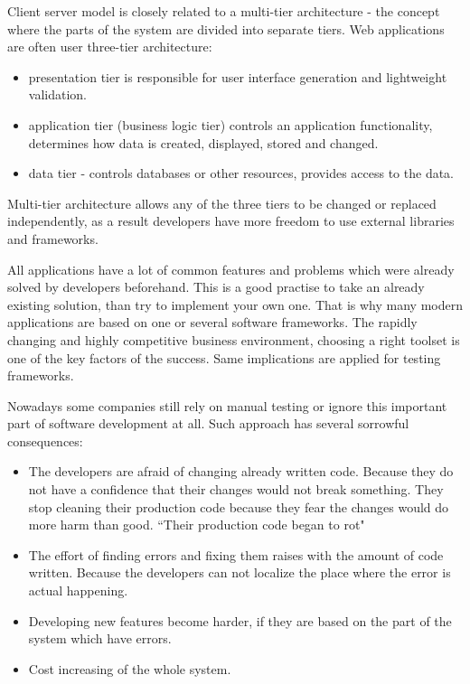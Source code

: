     	Client server model is closely related to a multi-tier architecture - the
    	concept where the parts of the system are divided into separate tiers. Web applications
    	 are often user three-tier architecture:
    	 \begin{itemize}
    	   \item presentation tier is responsible for user interface generation and
    	   lightweight validation.
    	   \item application tier (business logic tier) controls an application
    	   functionality, determines how data is created, displayed, stored and
    	   changed.
    	   \item data tier - controls databases or other resources, provides access
    	   to the data.
    	 \end{itemize}
    	Multi-tier architecture allows any of the three tiers to be changed or
    	replaced independently, as a result developers have more freedom to use
    	external libraries and frameworks.
		
		All	applications have a lot of common features and problems which were already
		solved by developers beforehand. This is a good practise to take an already
		existing solution, than try to implement your own one. That is why many modern applications 
		are based on one or several software frameworks. The rapidly changing and
		highly competitive business environment, choosing a right toolset is one of
		the key factors of the success.
		Same implications are applied for testing frameworks. 	
		
		Nowadays some companies still rely on manual testing or ignore this
		important part of software development at all. Such approach has several
		sorrowful consequences:
		\begin{itemize}
			\item The developers are afraid of changing already written
			code. Because they do not have a confidence that their changes would not 
			break something. They stop cleaning their production code because they fear the
			changes would do more harm than good. ``Their production code began to rot"
			\cite[p.123]{cleanCode} 
			
			\item The effort of finding errors and	fixing them raises with the amount of code written.
			Because the developers can not localize the place where the error is actual
			happening.
			\item Developing new features become harder, if they are based on the part
			of the system which have errors.
		
			\item Cost increasing of the whole system.
	 	 \end{itemize}
	 	 

